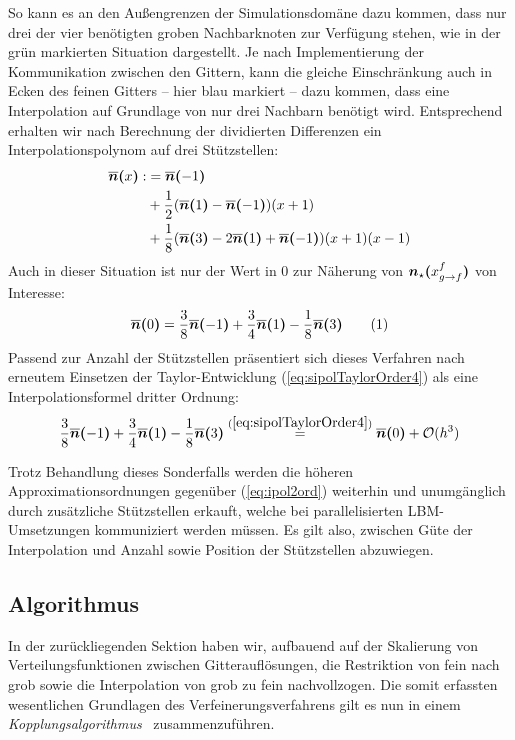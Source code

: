 \noindent
So kann es an den Außengrenzen der Simulationsdomäne dazu kommen, dass nur drei der vier benötigten groben Nachbarknoten zur Verfügung stehen, wie in der grün markierten Situation dargestellt.
Je nach Implementierung der Kommunikation zwischen den Gittern, kann die gleiche Einschränkung auch in Ecken des feinen Gitters -- hier blau markiert -- dazu kommen, dass eine Interpolation auf Grundlage von nur drei Nachbarn benötigt wird. Entsprechend erhalten wir nach Berechnung der dividierten Differenzen ein Interpolationspolynom auf drei Stützstellen:
\begin{align*}
\overline{\boldsymbol{n}}\boldsymbol{(}{x}\boldsymbol{)} :&= \overline{\boldsymbol{n}}\boldsymbol{(}{-1}\boldsymbol{)} \\
&+ \frac{1}{2}(\overline{\boldsymbol{n}}\boldsymbol{(}{1}\boldsymbol{)}-\overline{\boldsymbol{n}}\boldsymbol{(}{-1}\boldsymbol{)})(x+1)\\
&+ \frac{1}{8}(\overline{\boldsymbol{n}}\boldsymbol{(}{3}\boldsymbol{)}-2\overline{\boldsymbol{n}}\boldsymbol{(}{1}\boldsymbol{)}+\overline{\boldsymbol{n}}\boldsymbol{(}{-1}\boldsymbol{)})(x+1)(x-1)
\end{align*}
Auch in dieser Situation ist nur der Wert in \(0\) zur Näherung von \(\boldsymbol{n}_{\star}\boldsymbol{(}{x_{g \to f}^f}\boldsymbol{)}\) von Interesse:
\[\sipolarg{0} = \frac{3}{8}\sipolarg{-1} + \frac{3}{4}\sipolarg{1} - \frac{1}{8}\sipolarg{3} \numberthis\label{eq:ipol3ord}\]
Passend zur Anzahl der Stützstellen präsentiert sich dieses Verfahren nach erneutem Einsetzen der Taylor-Entwicklung (\ref{eq:sipolTaylorOrder4}) als eine Interpolationsformel dritter Ordnung:
\[\frac{3}{8}\overline{\boldsymbol{n}}\boldsymbol{(}{-1}\boldsymbol{)} + \frac{3}{4}\overline{\boldsymbol{n}}\boldsymbol{(}{1}\boldsymbol{)} - \frac{1}{8}\overline{\boldsymbol{n}}\boldsymbol{(}{3}\boldsymbol{)} \stackrel{(\ref{eq:sipolTaylorOrder4})}{=} \overline{\boldsymbol{n}}\boldsymbol{(}{0}\boldsymbol{)} + \mathcal{O}(h^3)\]

Trotz Behandlung dieses Sonderfalls werden die höheren Approximationsordnungen gegenüber (\ref{eq:ipol2ord}) weiterhin und unumgänglich durch zusätzliche Stützstellen erkauft, welche bei parallelisierten LBM-Umsetzungen kommuniziert werden müssen. Es gilt also, zwischen Güte der Interpolation und Anzahl sowie Position der Stützstellen abzuwiegen.

\newpage
\subsection{Algorithmus}\label{kap:Algorithmus}

In der zurückliegenden Sektion haben wir, aufbauend auf der Skalierung von Verteilungsfunktionen zwischen Gitterauflösungen, die Restriktion von fein nach grob sowie die Interpolation von grob zu fein nachvollzogen. Die somit erfassten wesentlichen Grundlagen des Verfeinerungsverfahrens gilt es nun in einem \emph{Kopplungsalgorithmus}~\cite[Kap.~3.5]{Lagrava12} zusammenzuführen.

